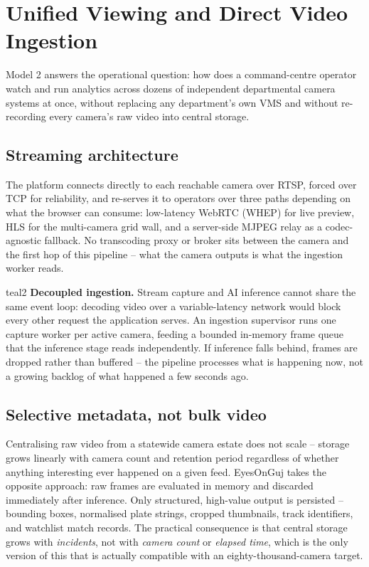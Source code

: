 \documentclass[11pt,a4paper]{article}
\begin{document}
\section{Unified Viewing and Direct Video Ingestion}
\label{sec:model2}

Model 2 answers the operational question: how does a command-centre
operator watch and run analytics across dozens of independent departmental
camera systems at once, without replacing any department's own VMS and
without re-recording every camera's raw video into central storage.

\subsection{Streaming architecture}

The platform connects directly to each reachable camera over RTSP,
forced over TCP for reliability, and re-serves it to operators over three
paths depending on what the browser can consume: low-latency WebRTC (WHEP)
for live preview, HLS for the multi-camera grid wall, and a server-side
MJPEG relay as a codec-agnostic fallback. No transcoding proxy or broker
sits between the camera and the first hop of this pipeline -- what the
camera outputs is what the ingestion worker reads.

\begin{statusbox}{teal2}
\textbf{Decoupled ingestion.} Stream capture and AI inference cannot share
the same event loop: decoding video over a variable-latency network would
block every other request the application serves. An ingestion supervisor
runs one capture worker per active camera, feeding a bounded in-memory
frame queue that the inference stage reads independently. If inference
falls behind, frames are dropped rather than buffered -- the pipeline
processes what is happening now, not a growing backlog of what happened a
few seconds ago.
\end{statusbox}

\subsection{Selective metadata, not bulk video}

Centralising raw video from a statewide camera estate does not scale --
storage grows linearly with camera count and retention period regardless
of whether anything interesting ever happened on a given feed. EyesOnGuj
takes the opposite approach: raw frames are evaluated in memory and
discarded immediately after inference. Only structured, high-value output
is persisted -- bounding boxes, normalised plate strings, cropped
thumbnails, track identifiers, and watchlist match records. The practical
consequence is that central storage grows with \emph{incidents}, not with
\emph{camera count} or \emph{elapsed time}, which is the only version of
this that is actually compatible with an eighty-thousand-camera target.
\end{document}
